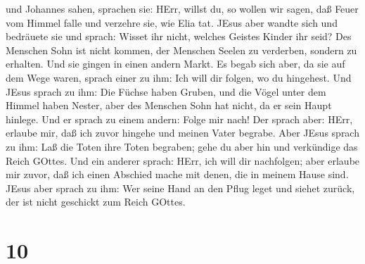 und Johannes sahen, sprachen sie: HErr, willst du, so wollen wir sagen,
daß Feuer vom Himmel falle und verzehre sie, wie Elia tat. 
JEsus aber wandte sich und bedräuete sie und sprach: Wisset ihr nicht,
welches Geistes Kinder ihr seid?  Des Menschen Sohn ist
nicht kommen, der Menschen Seelen zu verderben, sondern zu erhalten.
 Und sie gingen in einen andern Markt. Es begab sich aber,
da sie auf dem Wege waren, sprach einer zu ihm: Ich will dir folgen, wo
du hingehest.  Und JEsus sprach zu ihm: Die Füchse haben
Gruben, und die Vögel unter dem Himmel haben Nester, aber des Menschen
Sohn hat nicht, da er sein Haupt hinlege.  Und er sprach zu
einem andern: Folge mir nach! Der sprach aber: HErr, erlaube mir, daß
ich zuvor hingehe und meinen Vater begrabe.  Aber JEsus
sprach zu ihm: Laß die Toten ihre Toten begraben; gehe du aber hin und
verkündige das Reich GOttes.  Und ein anderer sprach: HErr,
ich will dir nachfolgen; aber erlaube mir zuvor, daß ich einen Abschied
mache mit denen, die in meinem Hause sind.  JEsus aber
sprach zu ihm: Wer seine Hand an den Pflug leget und siehet zurück, der
ist nicht geschickt zum Reich GOttes.

\hypertarget{section-9}{%
\section{10}\label{section-9}}

